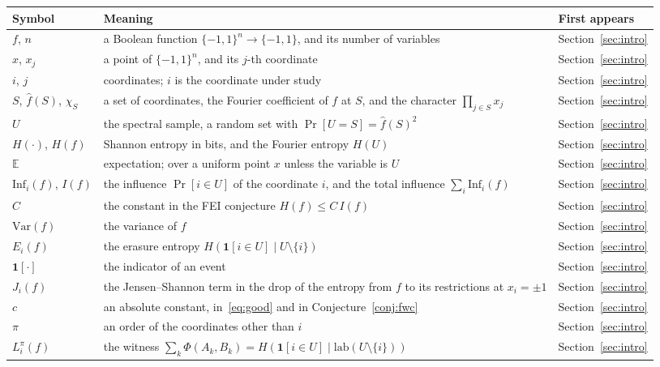 \documentclass[11pt]{amsart}
\theoremstyle{remark}
\newcommand{\Inf}{\mathrm{Inf}}
\newcommand{\Var}{\mathrm{Var}}
\newcommand{\E}{\mathbb{E}}
\newcommand{\lab}{\mathrm{lab}}
\begin{document}
\begin{longtable}{@{}>{\raggedright\arraybackslash}p{}>{\raggedright\arraybackslash}p{}>{\raggedright\arraybackslash}p{}@{}}
\toprule
Symbol & Meaning & First appears \\
\midrule
\endhead
$f$, $n$ & a Boolean function $\{-1,1\}^n\to\{-1,1\}$, and its number of variables & Section~\ref{sec:intro} \\
$x$, $x_j$ & a point of $\{-1,1\}^n$, and its $j$-th coordinate & Section~\ref{sec:intro} \\
$i$, $j$ & coordinates; $i$ is the coordinate under study & Section~\ref{sec:intro} \\
$S$, $\hat f(S)$, $\chi_S$ & a set of coordinates, the Fourier coefficient of $f$ at $S$, and the character $\prod_{j\in S}x_j$ & Section~\ref{sec:intro} \\
$U$ & the spectral sample, a random set with $\Pr[U=S]=\hat f(S)^2$ & Section~\ref{sec:intro} \\
$H(\cdot)$, $H(f)$ & Shannon entropy in bits, and the Fourier entropy $H(U)$ & Section~\ref{sec:intro} \\
$\E$ & expectation; over a uniform point $x$ unless the variable is $U$ & Section~\ref{sec:intro} \\
$\Inf_i(f)$, $I(f)$ & the influence $\Pr[i\in U]$ of the coordinate $i$, and the total influence $\sum_i\Inf_i(f)$ & Section~\ref{sec:intro} \\
$C$ & the constant in the FEI conjecture $H(f)\le C\,I(f)$ & Section~\ref{sec:intro} \\
$\Var(f)$ & the variance of $f$ & Section~\ref{sec:intro} \\
$E_i(f)$ & the erasure entropy $H(\mathbf 1[i\in U]\mid U\setminus\{i\})$ & Section~\ref{sec:intro} \\
$\mathbf 1[\cdot]$ & the indicator of an event & Section~\ref{sec:intro} \\
$J_i(f)$ & the Jensen--Shannon term in the drop of the entropy from $f$ to its restrictions at $x_i=\pm1$ & Section~\ref{sec:intro} \\
$c$ & an absolute constant, in~\eqref{eq:good} and in Conjecture~\ref{conj:fwc} & Section~\ref{sec:intro} \\
$\pi$ & an order of the coordinates other than $i$ & Section~\ref{sec:intro} \\
$L^\pi_i(f)$ & the witness $\sum_k\Phi(A_k,B_k)=H(\mathbf 1[i\in U]\mid\lab(U\setminus\{i\}))$ & Section~\ref{sec:intro} \\

\end{longtable}
\end{document}

